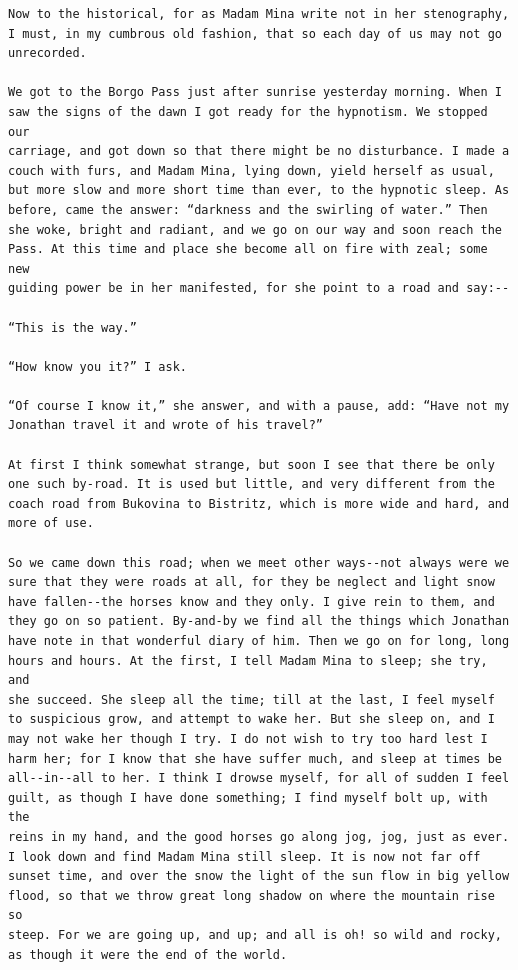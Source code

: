 \documentclass{article}
\begin{document}
\begin{verbatim}
Now to the historical, for as Madam Mina write not in her stenography,
I must, in my cumbrous old fashion, that so each day of us may not go
unrecorded.

We got to the Borgo Pass just after sunrise yesterday morning. When I
saw the signs of the dawn I got ready for the hypnotism. We stopped our
carriage, and got down so that there might be no disturbance. I made a
couch with furs, and Madam Mina, lying down, yield herself as usual,
but more slow and more short time than ever, to the hypnotic sleep. As
before, came the answer: “darkness and the swirling of water.” Then
she woke, bright and radiant, and we go on our way and soon reach the
Pass. At this time and place she become all on fire with zeal; some new
guiding power be in her manifested, for she point to a road and say:--

“This is the way.”

“How know you it?” I ask.

“Of course I know it,” she answer, and with a pause, add: “Have not my
Jonathan travel it and wrote of his travel?”

At first I think somewhat strange, but soon I see that there be only
one such by-road. It is used but little, and very different from the
coach road from Bukovina to Bistritz, which is more wide and hard, and
more of use.

So we came down this road; when we meet other ways--not always were we
sure that they were roads at all, for they be neglect and light snow
have fallen--the horses know and they only. I give rein to them, and
they go on so patient. By-and-by we find all the things which Jonathan
have note in that wonderful diary of him. Then we go on for long, long
hours and hours. At the first, I tell Madam Mina to sleep; she try, and
she succeed. She sleep all the time; till at the last, I feel myself
to suspicious grow, and attempt to wake her. But she sleep on, and I
may not wake her though I try. I do not wish to try too hard lest I
harm her; for I know that she have suffer much, and sleep at times be
all--in--all to her. I think I drowse myself, for all of sudden I feel
guilt, as though I have done something; I find myself bolt up, with the
reins in my hand, and the good horses go along jog, jog, just as ever.
I look down and find Madam Mina still sleep. It is now not far off
sunset time, and over the snow the light of the sun flow in big yellow
flood, so that we throw great long shadow on where the mountain rise so
steep. For we are going up, and up; and all is oh! so wild and rocky,
as though it were the end of the world.


\end{verbatim}
\end{document}
